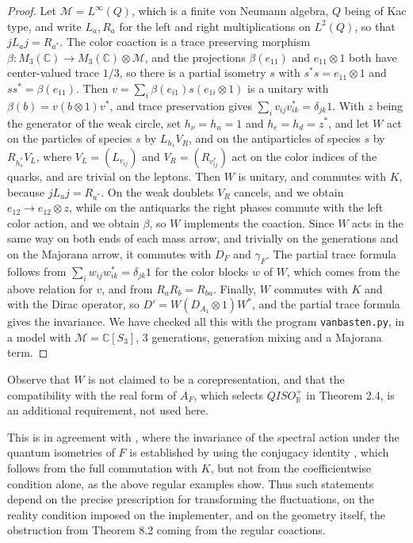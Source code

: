 \documentclass[11pt]{amsart}
\theoremstyle{definition}
\begin{document}
\begin{proof}
Let $\mathcal M=L^\infty(Q)$, which is a finite von Neumann algebra, $Q$ being of Kac type, and write $L_a,R_a$ for the left and right multiplications on $L^2(Q)$, so that $jL_aj=R_{a^*}$. The color coaction is a trace preserving morphism $\beta:M_3(\mathbb C)\to M_3(\mathbb C)\otimes\mathcal M$, and the projections $\beta(e_{11})$ and $e_{11}\otimes1$ both have center-valued trace $1/3$, so there is a partial isometry $s$ with $s^*s=e_{11}\otimes1$ and $ss^*=\beta(e_{11})$. Then $v=\sum_i\beta(e_{i1})s(e_{1i}\otimes1)$ is a unitary with $\beta(b)=v(b\otimes1)v^*$, and trace preservation gives $\sum_iv_{ij}v_{ik}^*=\delta_{jk}1$. With $z$ being the generator of the weak circle, set $h_\nu=h_u=1$ and $h_e=h_d=z^*$, and let $W$ act on the particles of species $s$ by $L_{h_s}V_R$, and on the antiparticles of species $s$ by $R_{h_s^*}V_L$, where $V_L=(L_{v_{ij}})$ and $V_R=(R_{v_{ij}^*})$ act on the color indices of the quarks, and are trivial on the leptons. Then $W$ is unitary, and commutes with $K$, because $jL_aj=R_{a^*}$. On the weak doublets $V_R$ cancels, and we obtain $e_{12}\to e_{12}\otimes z$, while on the antiquarks the right phases commute with the left color action, and we obtain $\beta$, so $W$ implements the coaction. Since $W$ acts in the same way on both ends of each mass arrow, and trivially on the generations and on the Majorana arrow, it commutes with $D_F$ and $\gamma_F$. The partial trace formula follows from $\sum_iw_{ij}w_{ik}^*=\delta_{jk}1$ for the color blocks $w$ of $W$, which comes from the above relation for $v$, and from $R_aR_b=R_{ba}$. Finally, $W$ commutes with $K$ and with the Dirac operator, so $D'=W(D_{A_1}\otimes1)W^*$, and the partial trace formula gives the invariance. We have checked all this with the program {\tt vanbasten.py}, in a model with $\mathcal M=\mathbb C[S_3]$, 3 generations, generation mixing and a Majorana term.
\end{proof}

Observe that $W$ is not claimed to be a corepresentation, and that the compatibility with the real form of $A_F$, which selects $QISO^+_{\mathbb R}$ in Theorem 2.4, is an additional requirement, not used here.

This is in agreement with \cite[section 4]{bdd}, where the invariance of the spectral action under the quantum isometries of $F$ is established by using the conjugacy identity \cite[(4.4)]{bdd}, which follows from the full commutation with $K$, but not from the coefficientwise condition alone, as the above regular examples show. Thus such statements depend on the precise prescription for transforming the fluctuations, on the reality condition imposed on the implementer, and on the geometry itself, the obstruction from Theorem 8.2 coming from the regular coactions.
\end{document}
